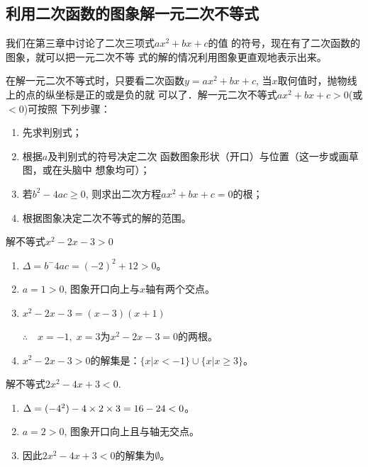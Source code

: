 \subsection{利用二次函数的图象解一元二次不等式}
我们在第三章中讨论了二次三项式$ax^2+bx+c$的值
的符号，现在有了二次函数的图象，就可以把一元二次不等
式的解的情况利用图象更直观地表示出来。

在解一元二次不等式时，只要看二次函数$y=ax^2+bx+
c$, 当$x$取何值时，抛物线上的点的纵坐标是正的或是负的就
可以了．解一元二次不等式$ax^2+bx+c>0$(或$<0$)可按照
下列步骤：
\begin{enumerate}
    \item 先求判别式；
    \item 根据$a$及判别式的符号决定二次
函数图象形状（开口）与位置（这一步或画草图，或在头脑中
想象均可）；
\item 若$b^2-4ac\ge 0$, 则求出二次方程$ax^2+bx+
c=0$的根；
\item 根据图象决定二次不等式的解的范围。
\end{enumerate}




\begin{example}
    解不等式$x^2-2x-3>0$
\end{example}

\begin{solution}
\begin{enumerate}
    \item $\Delta=b^-4ac=(-2)^2+12>0$。
    \item $a=1>0$, 图象开口向上与$x$轴有两个交点。
    \item $x^2-2x-3=(x-3)(x+1)$
    
    $\therefore\quad x=-1,\; x=3$为$x^2-2x-3=0$的两根。

    \item $x^2-2x-3>0$的解集是：$\{x|x<-1\}\cup \{x|x\ge 3\}$。
\end{enumerate}
\end{solution}

\begin{example}
解不等式$2x^2-4x+3<0$.
\end{example}

\begin{solution}
\begin{enumerate}
    \item $\Delta=(-4^2)-4\times2\times3=16-24<0$。
    \item $a=2>0$, 图象开口向上且与轴无交点。
    \item 因此$2x^2-4x+3<0$的解集为$\emptyset$。
\end{enumerate} 
\end{solution}

